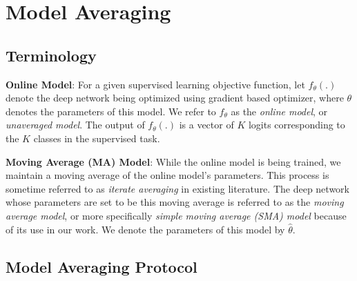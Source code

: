 \documentclass{article}
\begin{document}
\section{Model Averaging}

\subsection{Terminology}

\textbf{Online Model}: For a given supervised learning objective function, let $f_{\theta}(.)$ denote the deep network being optimized using gradient based optimizer, where $\theta$ denotes the parameters of this model. We refer to $f_{\theta}$ as the \textit{online model}, or \textit{unaveraged model}. The output of $f_{\theta}(.)$ is a vector of $K$ logits corresponding to the $K$ classes in the supervised task.

\textbf{Moving Average (MA) Model}: While the online model is being trained, we maintain a moving average of the online model's parameters. This process is sometime referred to as \textit{iterate averaging} in existing literature. The deep network whose parameters are set to be this moving average is referred to as the \textit{moving average model}, or more specifically \textit{simple moving average (SMA) model} because of its use in our work. We denote the parameters of this model by $\hat{\theta}.$ 

\subsection{Model Averaging Protocol}
\label{sec_protocol}
\end{document}
